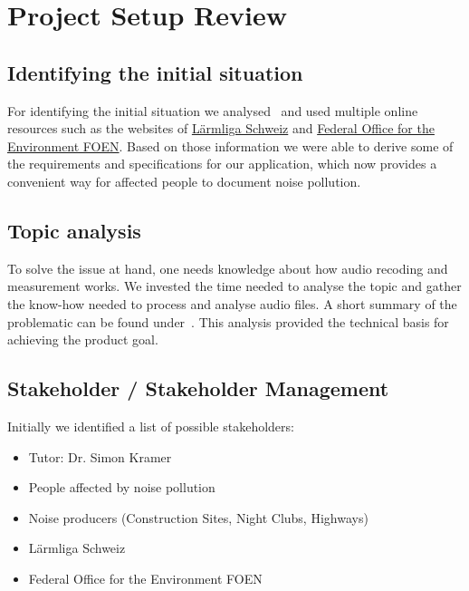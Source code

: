 \section{Project Setup Review}\label{sec:project-setup-review}

\subsection{Identifying the initial situation}\label{subsec:identifying-the-initial-situation}
For identifying the initial situation we analysed~ and used multiple online resources
such as the websites of \href{https://laermliga.ch/}{Lärmliga Schweiz} and \href{https://www.bafu.admin.ch/bafu/en/home/topics/noise/in-brief.html}{Federal Office for the Environment FOEN}.
Based on those information we were able to derive some of the requirements and specifications for our application,
which now provides a convenient way for affected people to document noise pollution.

\subsection{Topic analysis}\label{subsec:topic-analysis}
To solve the issue at hand, one needs knowledge about how audio recoding and measurement works.
We invested the time needed to analyse the topic and gather the know-how needed to process and analyse audio files.
A short summary of the problematic can be found under~.
This analysis provided the technical basis for achieving the product goal.

\subsection{Stakeholder / Stakeholder Management}\label{subsec:stakeholder-management}
Initially we identified a list of possible stakeholders:

\begin{itemize}
    \item Tutor: Dr. Simon Kramer
    \item People affected by noise pollution
    \item Noise producers (Construction Sites, Night Clubs, Highways)
    \item Lärmliga Schweiz
    \item Federal Office for the Environment FOEN
\end{itemize}

